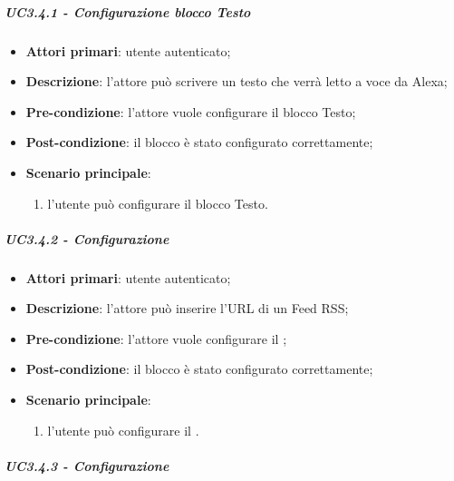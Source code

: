 \begin{itemize}
\begin{enumerate}
\end{enumerate}
\end{itemize}

\subparagraph{UC3.4.1 - Configurazione blocco Testo}

\begin{itemize}
\item \textbf{Attori primari}: utente autenticato;

\item \textbf{Descrizione}: l'attore può scrivere un testo che verrà letto a voce da Alexa;

\item \textbf{Pre-condizione}: l'attore vuole configurare il blocco Testo;

\item \textbf{Post-condizione}: il blocco è stato configurato correttamente;

\item \textbf{Scenario principale}:
\begin{enumerate}
\item  l'utente può configurare il blocco Testo.

\end{enumerate}
\end{itemize}

\subparagraph{UC3.4.2 - Configurazione \BFeedRSS{}}

\begin{itemize}
\item \textbf{Attori primari}: utente autenticato;

\item \textbf{Descrizione}: l'attore può inserire l'URL di un Feed RSS;

\item \textbf{Pre-condizione}: l'attore vuole configurare il \BFeedRSS{};

\item \textbf{Post-condizione}: il blocco è stato configurato correttamente;

\item \textbf{Scenario principale}:
\begin{enumerate}
\item  l'utente può configurare il \BFeedRSS{}.

\end{enumerate}
\end{itemize}

\subparagraph{UC3.4.3 - Configurazione \BFiltro{}}

